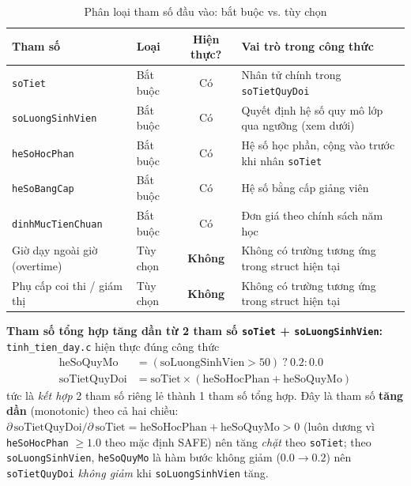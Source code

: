 \begin{table}[H]
  \centering
  \caption{Phân loại tham số đầu vào: bắt buộc vs. tùy chọn}
  \label{tab:params}
  \small
  \begin{tabularx}{\linewidth}{@{}l l c X@{}}
    \toprule
    \textbf{Tham số} & \textbf{Loại} & \textbf{Hiện thực?} & \textbf{Vai trò trong công thức} \\
    \midrule
    \texttt{soTiet} & Bắt buộc & Có & Nhân tử chính trong \texttt{soTietQuyDoi} \\
    \texttt{soLuongSinhVien} & Bắt buộc & Có & Quyết định hệ số quy mô lớp qua ngưỡng (xem dưới) \\
    \texttt{heSoHocPhan} & Bắt buộc & Có & Hệ số học phần, cộng vào trước khi nhân \texttt{soTiet} \\
    \texttt{heSoBangCap} & Bắt buộc & Có & Hệ số bằng cấp giảng viên \\
    \texttt{dinhMucTienChuan} & Bắt buộc & Có & Đơn giá theo chính sách năm học \\
    Giờ dạy ngoài giờ (overtime) & Tùy chọn & \textbf{Không} & Không có trường tương ứng trong struct hiện tại \\
    Phụ cấp coi thi / giám thị & Tùy chọn & \textbf{Không} & Không có trường tương ứng trong struct hiện tại \\
    \bottomrule
  \end{tabularx}
\end{table}

\textbf{Tham số tổng hợp tăng dần từ 2 tham số \texttt{soTiet} + \texttt{soLuongSinhVien}:} \texttt{tinh\_tien\_day.c} hiện thực đúng công thức
\begin{align*}
  \text{heSoQuyMo} &= (\text{soLuongSinhVien} > 50)\ ?\ 0.2 : 0.0 \\
  \text{soTietQuyDoi} &= \text{soTiet} \times (\text{heSoHocPhan} + \text{heSoQuyMo})
\end{align*}
tức là \emph{kết hợp} 2 tham số riêng lẻ thành 1 tham số tổng hợp. Đây là tham số \textbf{tăng dần} (monotonic) theo cả hai chiều: $\partial\,\text{soTietQuyDoi}/\partial\,\text{soTiet} = \text{heSoHocPhan}+\text{heSoQuyMo} > 0$ (luôn dương vì \texttt{heSoHocPhan} $\ge 1.0$ theo mặc định SAFE) nên tăng \emph{chặt} theo \texttt{soTiet}; theo \texttt{soLuongSinhVien}, \texttt{heSoQuyMo} là hàm bước không giảm ($0.0 \to 0.2$) nên \texttt{soTietQuyDoi} \emph{không giảm} khi \texttt{soLuongSinhVien} tăng.

